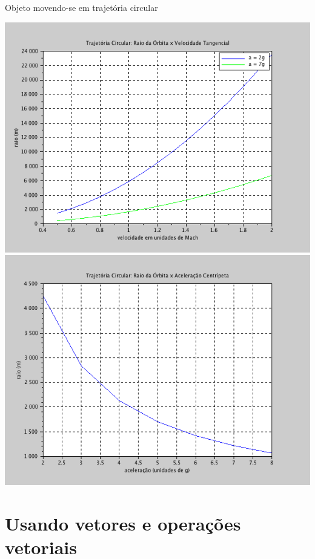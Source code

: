 \documentclass[11pt,fleqn]{practice}
\begin{document}
\begin{task}[breakable]{Objeto movendo-se em trajetória circular }{}
  \begin{center}
    \includegraphics[width=.6\linewidth]{images/trajetoria-circular-rxv}\\
    \includegraphics[width=.6\linewidth]{images/trajetoria-circular-rxa}
  \end{center}

  \tcblower
  \solution
\end{task}

\pagebreak 

\section{Usando vetores e operações vetoriais}
\end{document}
